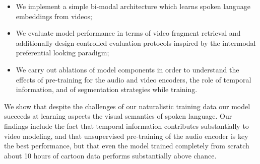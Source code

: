 \begin{itemize}
\item We implement a simple bi-modal architecture which learns
  spoken language embeddings from videos;
\item We evaluate model performance in terms of video fragment
  retrieval and additionally design controlled evaluation
  protocols inspired by the intermodal preferential looking
  paradigm;
\item We carry out ablations of model components in order to
  understand the effects of pre-training for the audio and video
  encoders, the role of temporal information, and of segmentation
  strategies while training. 
\end{itemize}

We show that despite the challenges of our naturalistic training data
our model succeeds at learning aspects the visual semantics of spoken
language. Our findings include the fact that temporal information
contributes substantially to video modeling, and that unsupervised
pre-training of the audio encoder is key the best performance, but that
even the model trained completely from scratch about 10 hours of
cartoon data performs substantially above chance.



